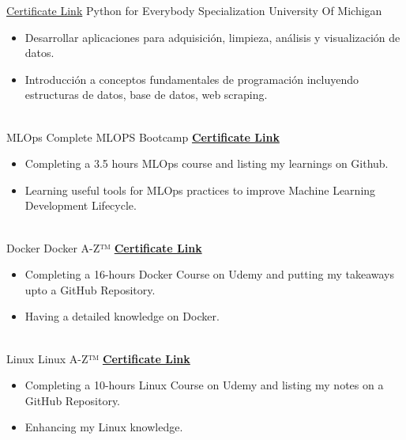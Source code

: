 \documentclass[letterpaper]{DS_class_file} %
\begin{document}
\begin{twenty} %
    \twentyitem
    {\href{https://www.coursera.org/account/accomplishments/specialization/AXSM8CKGRN8G}{\scriptsize{Certificate Link}}}
	{}
	{\hspace{0.1cm}Python for Everybody Specialization}
	{University Of Michigan}
	{}
	{
		{\begin{itemize}
				\item Desarrollar aplicaciones para adquisición, limpieza, análisis y visualización de datos.
				\item Introducción a conceptos fundamentales de programación incluyendo estructuras de datos, base de datos, web scraping.
		\end{itemize}}
	}
	\\
	\twentyitem
	{MLOps}
	{}
	{\hspace{0.3cm}Complete MLOPS Bootcamp}
	{\href{https://www.udemy.com/certificate/UC-2296034a-bb96-4d35-80b5-dd956cceeeb7/}{\textbf{Certificate Link}}}
	{}
	{
		{\begin{itemize}
				\item Completing a 3.5 hours MLOps course and listing my learnings on Github.
				\item Learning useful tools for MLOps practices to improve Machine Learning Development Lifecycle.
		\end{itemize}}
	}
	\\
	\twentyitem
	{Docker}
	{}
	{\hspace{0.3cm}Docker A-Z™}
	{\href{https://www.udemy.com/certificate/UC-c1ab98de-9803-452b-9166-8ef3ae797e5a/}{\textbf{Certificate Link}}}
	{}
	{
		{\begin{itemize}
				\item Completing a 16-hours Docker Course on Udemy and putting my takeaways upto a GitHub Repository.
				\item Having a detailed knowledge on Docker.
		\end{itemize}}
	}
	\\
	\twentyitem
	{Linux}
	{}
	{\hspace{0.3cm}Linux A-Z™}
	{\href{https://www.udemy.com/certificate/UC-74719d94-89af-44ba-ab2d-4299dd2ec3dd/}{\textbf{Certificate Link}}}
	{}
	{
		{\begin{itemize}
				\item Completing a 10-hours Linux Course on Udemy and listing my notes on a GitHub Repository.
				\item Enhancing my Linux knowledge.
		\end{itemize}}
}
\end{twenty}
\end{document}
